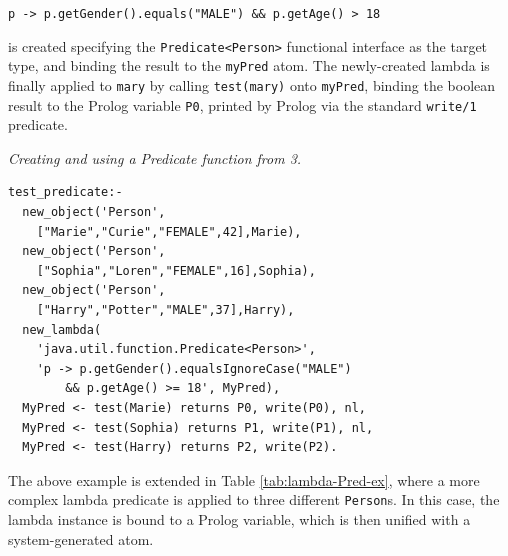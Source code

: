 \verb|p -> p.getGender().equals("MALE") && p.getAge() > 18|

\noindent is created specifying the \texttt{Predicate<Person>} functional interface as the target type, and binding the result to the \texttt{myPred} atom. The newly-created lambda is finally applied to \texttt{mary} by calling \texttt{test(mary)} onto \texttt{myPred}, binding the boolean result to the Prolog variable \texttt{P0}, printed by Prolog via the standard \texttt{write/1} predicate.


\begin{table} %
\caption{\emph{Creating and using a Predicate function from \tuprolog{} 3.}}
\lstset{
   showlines=true
}
\begin{lstlisting}[language=tuProlog,
	caption={},
	label={tab:lambda-Pred-ex}]
test_predicate:-
  new_object('Person',
    ["Marie","Curie","FEMALE",42],Marie),
  new_object('Person',
    ["Sophia","Loren","FEMALE",16],Sophia),
  new_object('Person',
    ["Harry","Potter","MALE",37],Harry),
  new_lambda(
  	'java.util.function.Predicate<Person>',
  	'p -> p.getGender().equalsIgnoreCase("MALE")
  		&& p.getAge() >= 18', MyPred),
  MyPred <- test(Marie) returns P0, write(P0), nl,
  MyPred <- test(Sophia) returns P1, write(P1), nl,
  MyPred <- test(Harry) returns P2, write(P2).
\end{lstlisting}
\end{table}

The above example is extended in Table \ref{tab:lambda-Pred-ex}, where a more complex lambda predicate is applied to three different \texttt{Person}s. In this case, the lambda instance is bound to a Prolog variable, which is then unified with a system-generated atom.


